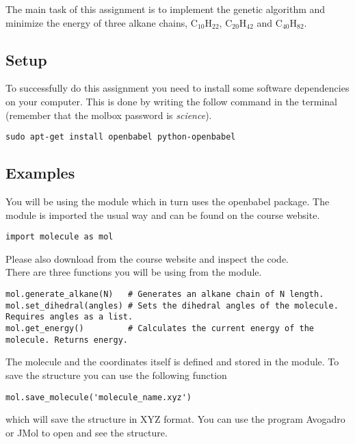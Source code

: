 \documentclass{article}
\begin{document}
The main task of this assignment is to implement the genetic algorithm and minimize the energy of three alkane chains,
C$_{10}$H$_{22}$,
C$_{20}$H$_{42}$ and
C$_{40}$H$_{82}$.

\subsection{Setup}

To successfully do this assignment you need to install some software dependencies on your computer.
This is done by writing the follow command in the terminal (remember that the molbox password is \emph{science}).

\begin{lstlisting}
sudo apt-get install openbabel python-openbabel
\end{lstlisting}

\subsection{Examples}

You will be using the module  which in turn uses the openbabel package.
The module is imported the usual way and can be found on the course website.

\begin{lstlisting}
import molecule as mol
\end{lstlisting}

Please also download  from the course website and inspect the code.\\

There are three functions you will be using from the module.

\begin{lstlisting}
mol.generate_alkane(N)   # Generates an alkane chain of N length.
mol.set_dihedral(angles) # Sets the dihedral angles of the molecule. Requires angles as a list.
mol.get_energy()         # Calculates the current energy of the molecule. Returns energy.
\end{lstlisting}

The molecule and the coordinates itself is defined and stored in the  module.
To save the structure you can use the following function

\begin{lstlisting}
mol.save_molecule('molecule_name.xyz')
\end{lstlisting}

which will save the structure in XYZ format.
You can use the program Avogadro or JMol to open and see the structure.
\end{document}
